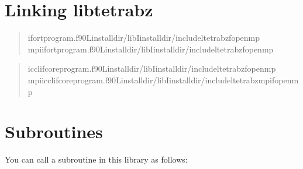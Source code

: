 \documentclass[letterpaper,10pt,pdftex,openany,english]{sphinxmanual}
\begin{document}
\chapter{Linking libtetrabz}
\label{\detokenize{link:linking-libtetrabz}}\label{\detokenize{link::doc}}
\sphinxAtStartPar
{}
\begin{quote}

\begin{sphinxVerbatim}[commandchars=\\\{\}]
\PYGZdl{}ifortprogram.f90\PYGZhy{}Linstall\PYGZus{}dir/lib\PYGZhy{}Iinstall\PYGZus{}dir/include\PYGZhy{}ltetrabz\PYGZhy{}fopenmp
\PYGZdl{}mpiifortprogram.f90\PYGZhy{}Linstall\PYGZus{}dir/lib\PYGZhy{}Iinstall\PYGZus{}dir/include\PYGZhy{}ltetrabz\PYGZhy{}fopenmp
\end{sphinxVerbatim}
\end{quote}

\sphinxAtStartPar
{}
\begin{quote}

\begin{sphinxVerbatim}[commandchars=\\\{\}]
\PYGZdl{}icc\PYGZhy{}lifcoreprogram.f90\PYGZhy{}Linstall\PYGZus{}dir/lib\PYGZhy{}Iinstall\PYGZus{}dir/include\PYGZhy{}ltetrabz\PYGZhy{}fopenmp
\PYGZdl{}mpiicc\PYGZhy{}lifcoreprogram.f90\PYGZhy{}Linstall\PYGZus{}dir/lib\PYGZhy{}Iinstall\PYGZus{}dir/include\PYGZhy{}ltetrabz\PYGZus{}mpi\PYGZhy{}fopenmp
\end{sphinxVerbatim}
\end{quote}

\sphinxstepscope


\chapter{Subroutines}
\label{\detokenize{routine:subroutines}}\label{\detokenize{routine::doc}}
\sphinxAtStartPar
You can call a subroutine in this library as follows:

\begin{sphinxVerbatim}[commandchars=\\\{\}]

\end{sphinxVerbatim}
\end{document}
